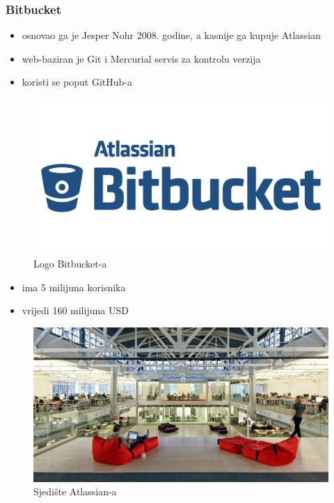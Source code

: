 \documentclass[12p, Times New Roman]{beamer}
\begin{document}
	\begin{frame}      			%
		\frametitle{Bitbucket}

		\begin{itemize}
			\item osnovao ga je Jesper Nohr 2008. godine, a kasnije ga kupuje Atlassian
			\item web-baziran je Git i Mercurial servis za kontrolu verzija
			\item koristi se poput GitHub-a

		\end{itemize}

		\begin{figure}[h!]
			\begin{center}
				\includegraphics[scale=0.04]{Bitbucket.png}
				\caption{Logo Bitbucket-a}
			\end{center}
		\end{figure}

	\end{frame}                



	\begin{frame}				%
		\begin{itemize}
			\item ima 5 milijuna korisnika
			\item vrijedi 160 milijuna USD

		\end{itemize}

		\begin{figure}[h!]
			\begin{center}
				\includegraphics[scale=0.135]{headqbit.png}
				\caption{Sjedište Atlassian-a}
			\end{center}
		\end{figure}


	\end{frame}
\end{document}
